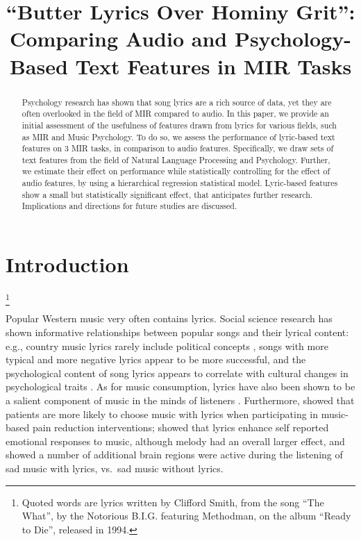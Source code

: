 \documentclass{article}
\title{``Butter Lyrics Over Hominy Grit''\textsuperscript{\textdagger}: Comparing Audio and Psychology-Based Text Features in MIR Tasks}
\newcommand\blfootnote[1]{%
  \begingroup
  \renewcommand\thefootnote{}\footnote{#1}%
  \addtocounter{footnote}{-1}%
  \endgroup
}
\begin{document}
%
\maketitle
%
\begin{abstract}
Psychology research has shown that song lyrics are a rich source of data, yet they are often overlooked in the field of MIR compared to audio. In this paper, we provide an initial assessment of the usefulness of features drawn from lyrics for various fields, such as MIR and Music Psychology. To do so, we assess the performance of lyric-based text features on 3 MIR tasks, in comparison to audio features. Specifically, we draw sets of text features from the field of Natural Language Processing and Psychology. Further, we estimate their effect on performance while statistically controlling for the effect of audio features, by using a hierarchical regression statistical model. Lyric-based features show a small but statistically significant effect, that anticipates further research. Implications and directions for future studies are discussed. 
\end{abstract}
%
\section{Introduction}
\label{sec:introduction}
\blfootnote{\textsuperscript{\textdagger}Quoted words are lyrics written by Clifford Smith, from the song ``The What'', by the Notorious B.I.G. featuring Methodman, on the album ``Ready to Die'', released in 1994.}Popular Western music very often contains lyrics. Social science research has shown informative relationships between popular songs and their lyrical content: e.g., country music lyrics rarely include political concepts \cite{van2005world}, songs with more typical \cite{north2020relationship} and more negative \cite{brand2019cultural} lyrics appear to be more successful, and the psychological content of song lyrics appears to correlate with cultural changes in psychological traits \cite{dewall2011tuning}. As for music consumption, lyrics have also been shown to be a salient component of music in the minds of listeners \cite{demetriou2018vocals}. Furthermore, \cite{howlin2020patients} showed that patients are more likely to choose music with lyrics when participating in music-based pain reduction interventions; \cite{ali2006songs} showed that lyrics enhance self reported emotional responses to music, although melody had an overall larger effect, and \cite{brattico2011functional} showed a number of additional brain regions were active during the listening of sad music with lyrics, vs.\ sad music without lyrics. 
\end{document}
